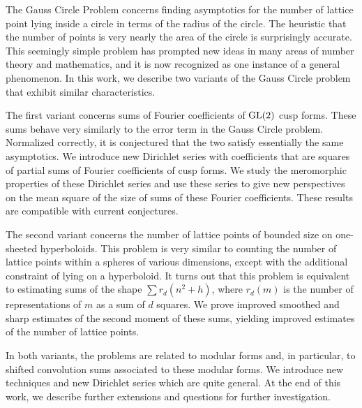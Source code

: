 
The Gauss Circle Problem concerns finding asymptotics for the number of lattice point
lying inside a circle in terms of the radius of the circle.
The heuristic that the number of points is very nearly the area of the circle is
surprisingly accurate.
This seemingly simple problem has prompted new ideas in many areas of number theory and
mathematics, and it is now recognized as one instance of a general phenomenon.
In this work, we describe two variants of the Gauss Circle problem that exhibit similar
characteristics.




The first variant concerns sums of Fourier coefficients of $\operatorname{GL}(2)$ cusp forms.
These sums behave very similarly to the error term in the Gauss Circle problem.
Normalized correctly, it is conjectured that the two satisfy essentially the same
asymptotics.
We introduce new Dirichlet series with coefficients that are squares of partial sums of
Fourier coefficients of cusp forms.
We study the meromorphic properties of these Dirichlet series and use these series to give
new perspectives on the mean square of the size of sums of these Fourier coefficients.
These results are compatible with current conjectures.




The second variant concerns the number of lattice points of bounded size on one-sheeted
hyperboloids.
This problem is very similar to counting the number of lattice points
within a spheres of various dimensions, except with the additional constraint of lying on
a hyperboloid.
It turns out that this problem is equivalent to estimating sums of the shape
$\sum r_d(n^2 + h)$, where $r_d(m)$ is the number of representations of $m$ as a sum of
$d$ squares.
We prove improved smoothed and sharp estimates of the second moment of these sums,
yielding improved estimates of the number of lattice points.




In both variants, the problems are related to modular forms and, in particular, to shifted
convolution sums associated to these modular forms.
We introduce new techniques and new Dirichlet series which are quite general.
At the end of this work, we describe further extensions and questions for further
investigation.




